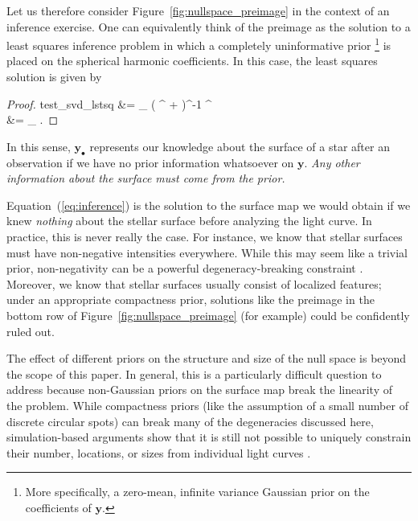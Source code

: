 \documentclass[modern]{aastex62}
\begin{document}
Let us therefore consider Figure~\ref{fig:nullspace_preimage} in the
context of an inference exercise. One can equivalently think of
the preimage as the solution to a least squares inference problem
in which a completely uninformative prior%
\footnote{%
    More specifically, a zero-mean, infinite variance Gaussian prior on the coefficients of $\mathbf{y}$.
}
is placed on the spherical harmonic
coefficients. In this case, the least squares solution is given by
%
\begin{proof}{test_svd_lstsq}
    \label{eq:inference}
    &=
    \lim_{\lambda {}} \left( ^\top {} + \lambda {}\right)^{-1} ^\top {}
    \nonumber\\
    &= _\bullet
    \quad.
\end{proof}
%
In this sense, $\mathbf{y}_\bullet$ represents our knowledge about the
surface of a star after an observation if we have no prior information
whatsoever on $\mathbf{y}$.
\emph{Any other information about the surface must come from the prior.}%

Equation~(\ref{eq:inference}) is the solution to the surface map
we would obtain if we knew \emph{nothing} about the stellar surface
before analyzing the light curve. In practice, this is never really
the case. For instance, we know that stellar surfaces
must have non-negative intensities everywhere. While this may seem
like a trivial prior, non-negativity can be a powerful degeneracy-breaking
constraint \citep[e.g.,][]{Fienup1982}. Moreover, we know that
stellar surfaces usually consist of localized features; under an
appropriate compactness prior, solutions
like the preimage in the bottom row of
Figure~\ref{fig:nullspace_preimage} (for example) could be
confidently ruled out.

The effect of different priors on the structure and size of the null
space is beyond the scope of this paper. In general, this is a particularly
difficult question to address because non-Gaussian priors on the
surface map break the linearity of the problem. While compactness priors
(like the assumption of a small number of discrete circular spots) can
break many of the degeneracies discussed here, simulation-based
arguments show that it is still not possible to uniquely constrain
their number, locations, or sizes from individual light curves
\citep{Basri2020}.

\end{document}
